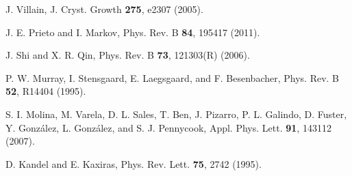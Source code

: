 \documentclass[aps,prl,showpacs,twocolumn,byrevtex,floatfix]{revtex4-1}
\begin{document}
\begin{thebibliography}{99}
J. Villain, J. Cryst. Growth {\bf 275}, e2307 (2005).

J. E. Prieto and I. Markov, Phys. Rev. B {\bf 84}, 195417 (2011).

J. Shi and X. R. Qin, Phys. Rev. B {\bf 73}, 121303(R) (2006).

P. W. Murray, I. Stensgaard, E. Laegsgaard, and F. Besenbacher, Phys. Rev. B
{\bf 52}, R14404 (1995).

S. I. Molina, M. Varela, D. L. Sales, T. Ben, J. Pizarro, P. L. Galindo, D.
Fuster, Y. Gonz\'alez, L. Gonz\'alez, and S. J. Pennycook, Appl. Phys. Lett.
{\bf 91}, 143112 (2007).

D. Kandel and E. Kaxiras, Phys. Rev. Lett. {\bf 75}, 2742 (1995).




\end{thebibliography}
\end{document}
